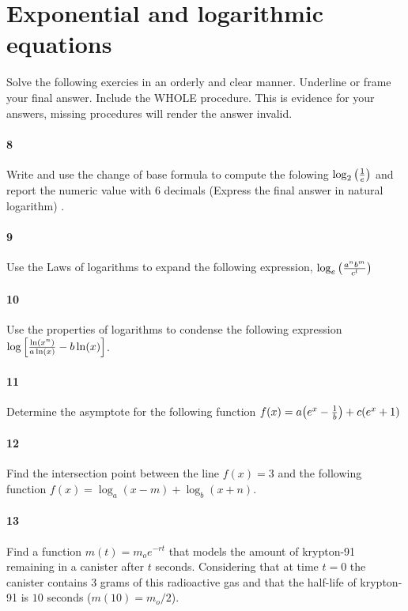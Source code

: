 \documentclass[main.tex]{subfiles}
\begin{document}
\section{Exponential and logarithmic equations}
Solve the following exercies in an orderly and clear manner.
Underline or frame your final answer.
Include the WHOLE procedure.
This is evidence for your answers, missing procedures will render the answer invalid.

\paragraph{8} Write and use the change of base formula to compute the folowing $\log_2\qty(\frac{1}{e})$  and report the numeric value with 6 decimals (Express the final answer in natural logarithm) .

\paragraph{9} Use the Laws of logarithms to expand the following expression, $ \log_e\qty(\frac{a^nb^m}{c^l}) $

\paragraph{10} Use the properties of logarithms to condense the following expression $ \log\qty[\frac{\ln(x^n)}{a\ln(x)}-b\ln(x)] $.

\paragraph{11} Determine the asymptote for the following function $ f(x)=a\qty(e^x-\frac{1}{b})+c(e^x+1) $

\paragraph{12} Find the intersection point between the line $f(x)=3$ and the following function $ f(x)=\log_a(x-m) + \log_b(x+n) $.

\paragraph{13} Find a function $m(t) = m_o e^{-rt}$ that models the amount of krypton-91 remaining in a canister after $t$ seconds.
Considering that at time $t=0$ the canister contains $3$ grams of this radioactive gas and that the half-life of krypton-91 is $10$ seconds ($m(10)=m_o/2$).
\end{document}
